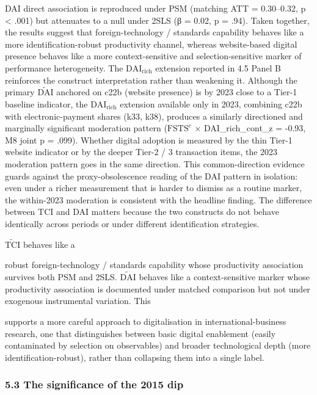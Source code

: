 \documentclass[12pt,a4paper]{article}
\begin{document}
DAI direct association is reproduced under PSM (matching ATT =
0.30--0.32, p \textless{} .001) but attenuates to a null under 2SLS (β =
0.02, p = .94). Taken together, the results suggest that
foreign-technology / standards capability behaves like a more
identification-robust productivity channel, whereas website-based
digital presence behaves like a more context-sensitive and
selection-sensitive marker of performance heterogeneity. The
\(\mathrm{DAI}_{\text{rich}}\) extension reported in 4.5 Panel B
reinforces the construct interpretation rather than weakening it.
Although the primary \(\tilde{\mathrm{DAI}}\) anchored on c22b (website
presence) is by 2023 close to a Tier-1 baseline indicator, the
\(\mathrm{DAI}_{\text{rich}}\) extension available only in 2023,
combining c22b with electronic-payment shares (k33, k38), produces a
similarly directioned and marginally significant moderation pattern
(\(\mathrm{FSTS}^{c}\) × DAI\_rich\_cont\_z = -0.93, M8 joint p = .099).
Whether digital adoption is measured by the thin Tier-1 website
indicator or by the deeper Tier-2 / 3 transaction items, the 2023
moderation pattern goes in the same direction. This common-direction
evidence guards against the proxy-obsolescence reading of the DAI
pattern in isolation: even under a richer measurement that is harder to
dismiss as a routine marker, the within-2023 moderation is consistent
with the headline finding. The difference between TCI and DAI matters
because the two constructs do not behave identically across periods or
under different identification strategies.

\(\tilde{\mathrm{TCI}}\) behaves like a

robust foreign-technology / standards capability whose productivity
association survives both PSM and 2SLS. \(\tilde{\mathrm{DAI}}\) behaves
like a context-sensitive marker whose productivity association is
documented under matched comparison but not under exogenous instrumental
variation. This

supports a more careful approach to digitalisation in
international-business research, one that distinguishes between basic
digital enablement (easily contaminated by selection on observables) and
broader technological depth (more identification-robust), rather than
collapsing them into a single label.

\hypertarget{53-the-significance-of-the-2015-dip}{%
\subsubsection{5.3 The significance of the 2015
dip}\label{53-the-significance-of-the-2015-dip}}
\end{document}
